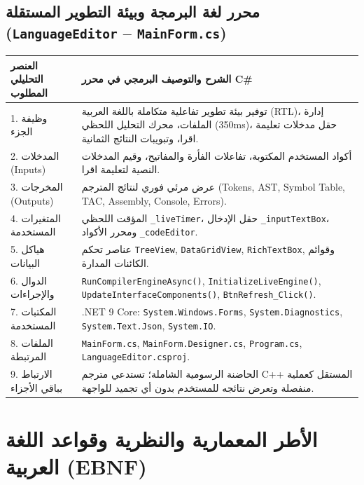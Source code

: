 \documentclass[11pt,a4paper,oneside]{report}
\begin{document}
\section{محرر لغة البرمجة وبيئة التطوير المستقلة (\texttt{LanguageEditor} -- \texttt{MainForm.cs})}
\begin{longtable}{|p{4.2cm}|p{12.2cm}|}
\hline
\rowcolor{NavyBlue}\color{white}\textbf{\arabicfont العنصر التحليلي المطلوب} & \rowcolor{NavyBlue}\color{white}\textbf{\arabicfont الشرح والتوصيف البرمجي في محرر C\#} \\
\hline
\endhead
1. وظيفة الجزء & توفير بيئة تطوير تفاعلية متكاملة باللغة العربية (RTL)، إدارة الملفات، محرك التحليل اللحظي (350ms)، حقل مدخلات تعليمة اقرا، وتبويبات النتائج الثمانية. \\
\hline
2. المدخلات (Inputs) & أكواد المستخدم المكتوبة، تفاعلات الفأرة والمفاتيح، وقيم المدخلات النصية لتعليمة اقرا. \\
\hline
3. المخرجات (Outputs) & عرض مرئي فوري لنتائج المترجم (Tokens, AST, Symbol Table, TAC, Assembly, Console, Errors). \\
\hline
4. المتغيرات المستخدمة & المؤقت اللحظي \texttt{\_liveTimer}، حقل الإدخال \texttt{\_inputTextBox}، ومحرر الأكواد \texttt{\_codeEditor}. \\
\hline
5. هياكل البيانات & عناصر تحكم \texttt{TreeView}, \texttt{DataGridView}, \texttt{RichTextBox}, وقوائم الكائنات المدارة. \\
\hline
6. الدوال والإجراءات & \texttt{RunCompilerEngineAsync()}, \texttt{InitializeLiveEngine()}, \texttt{UpdateInterfaceComponents()}, \texttt{BtnRefresh\_Click()}. \\
\hline
7. المكتبات المستخدمة & .NET 9 Core: \texttt{System.Windows.Forms}, \texttt{System.Diagnostics}, \texttt{System.Text.Json}, \texttt{System.IO}. \\
\hline
8. الملفات المرتبطة & \texttt{MainForm.cs}, \texttt{MainForm.Designer.cs}, \texttt{Program.cs}, \texttt{LanguageEditor.csproj}. \\
\hline
9. الارتباط بباقي الأجزاء & الحاضنة الرسومية الشاملة؛ تستدعي مترجم C++ المستقل كعملية منفصلة وتعرض نتائجه للمستخدم بدون أي تجميد للواجهة. \\
\hline
\end{longtable}

\chapter{الأطر المعمارية والنظرية وقواعد اللغة العربية (EBNF)}
\end{document}
